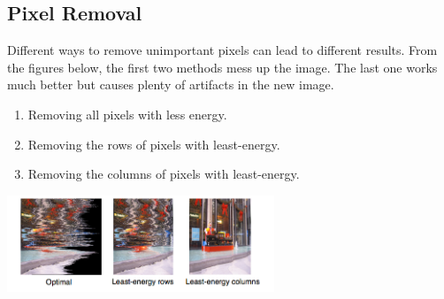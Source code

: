 \documentclass{article}
\begin{document}
\subsection{Pixel Removal}
Different ways to remove unimportant pixels can lead to different results. From the figures below, the first two methods mess up the image. The last one works much better but causes plenty of artifacts in the new image.
\begin{enumerate}
\item Removing all pixels with less energy.
\item Removing the rows of pixels with least-energy.
\item Removing the columns of pixels with least-energy.
\end{enumerate}
\begin{center}
\hspace*{1.2cm}\includegraphics[width=8cm]{Pixel_Removal.png}
\end{center}
\end{document}
